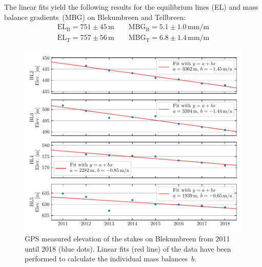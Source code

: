 The linear fits yield the following results for the equilibrium lines (EL) and mass balance gradients~(MBG) on Blekumbreen and Tellbreen:
\begin{equation*}
\begin{split}
\text{EL}_\text{B} = 751 \pm 45\, \text{m} \qquad \text{MBG}_\text{B} = 5.1 \pm 1.0\, \text{mm/m}\\
\text{EL}_\text{T} = 757 \pm 56\, \text{m} \qquad \text{MBG}_\text{T} = 6.8 \pm 1.4\, \text{mm/m}
\end{split}
\end{equation*}


\begin{figure}[htb]
    \centering
    \includegraphics[width=\textwidth]{./figs/Elevation_Blekumbreen.pdf}
    \caption{GPS measured elevation of the stakes on Blekumbreen from 2011 until 2018 (blue dots).
    Linear fits (red line) of the data have been performed to calculate the individual mass balances~$b$.}
    \label{GPS:fig:elev_ble}
\end{figure}


